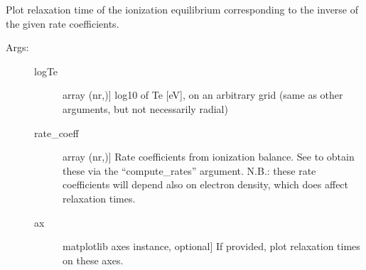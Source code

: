 \documentclass[letterpaper,10pt,english]{sphinxmanual}
\begin{document}
\begin{fulllineitems}
\label{\detokenize{aurora:aurora.atomic.plot_relax_time}}
Plot relaxation time of the ionization equilibrium corresponding
to the inverse of the given rate coefficients.
\begin{description}
\item[{Args:}] \leavevmode\begin{description}
\item[{logTe}] \leavevmode{[}array (nr,){]}
log\sphinxhyphen{}10 of Te {[}eV{]}, on an arbitrary grid (same as other arguments, but not
necessarily radial)

\item[{rate\_coeff}] \leavevmode{[}array (nr,){]}
Rate coefficients from ionization balance. See {\hyperref[\detokenize{aurora:aurora.atomic.get_frac_abundances}]{}}
to obtain these via the “compute\_rates” argument. 
N.B.: these rate coefficients will depend also on electron density, which does affect 
relaxation times.

\item[{ax}] \leavevmode{[}matplotlib axes instance, optional{]}
If provided, plot relaxation times on these axes.

\end{description}

\end{description}

\end{fulllineitems}

\end{document}
